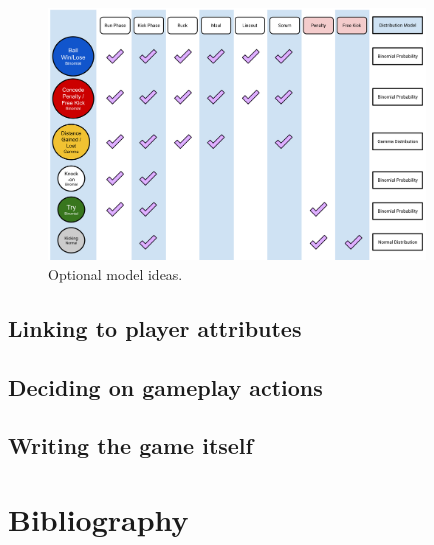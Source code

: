 \documentclass{book}
\begin{document}
\begin{figure}[h]
\includegraphics[width=10cm]{images/trywizard-model-ideas-sketch.png}
\caption{Optional model ideas.}
\label{fig:model-ideas}
\end{figure}

\section{\sffamily Linking to player attributes}

\section{\sffamily Deciding on gameplay actions}

\section{\sffamily Writing the game itself}

\backmatter
\chapter*{Bibliography}


\end{document}
